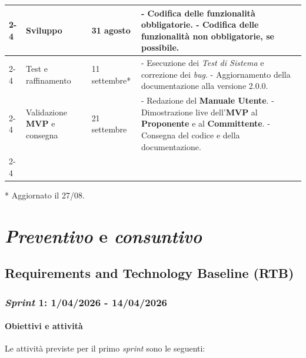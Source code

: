\documentclass[12pt, a4paper]{article}
\begin{document}
{\begin{table}[H]
{\begin{tabularx}{1.1\textwidth}{|m{5em}|p{11em}|p{7.5em}|X|}
            
            \cline{2-4}
            & Sviluppo & 31 agosto & - Codifica delle funzionalità obbligatorie. \newline
            - Codifica delle funzionalità non obbligatorie, se possibile. \\ 
            \cline{2-4}
            & Test e raffinamento & 11 settembre* & - Esecuzione dei \textit{Test di Sistema} e correzione dei \textit{bug}. \newline
            - Aggiornamento della documentazione alla versione 2.0.0. \\ 
            \cline{2-4}
            & Validazione \textbf{MVP} e consegna & 21 settembre & - Redazione del \textbf{Manuale Utente}. \newline
            - Dimostrazione live dell'\textbf{MVP} al \textbf{Proponente} e al \textbf{Committente}. \newline 
            - Consegna del codice e della documentazione. \\ 
            \cline{2-4}
  
            \hline
        \end{tabularx}
    }
\end{table}
* Aggiornato il 27/08.

\newpage
\section{\textit{Preventivo} e \textit{consuntivo}}

\subsection{Requirements and Technology Baseline (\textbf{RTB})}

\subsubsection{\textit{Sprint} 1: 1/04/2026 - 14/04/2026}

\paragraph{Obiettivi e attività}

Le attività previste per il primo \textit{sprint} sono le seguenti:

}
\end{document}

